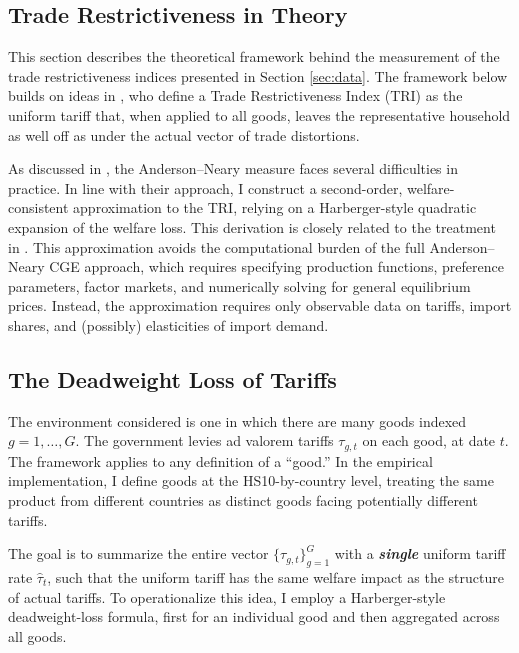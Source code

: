 \documentclass[12pt,pdftex]{article}
\begin{document}
\begin{onehalfspacing}
\section{Trade Restrictiveness in Theory}\label{sec:theory}

This section describes the theoretical framework behind the measurement of the trade restrictiveness indices presented in Section \ref{sec:data}. The framework below builds on ideas in \citet{anderson1996new, anderson2005measuring}, who define a Trade Restrictiveness Index (TRI) as the uniform tariff that, when applied to all goods, leaves the representative household as well off as under the actual vector of trade distortions.

As discussed in \citet{keeNicitaOlarreaga2009}, the Anderson--Neary measure faces several difficulties in practice. In line with their approach, I construct a second-order, welfare-consistent approximation to the TRI, relying on a Harberger-style quadratic expansion of the welfare loss. This derivation is closely related to the treatment in \citet{feenstra1995estimating}. This approximation avoids the computational burden of the full Anderson--Neary CGE approach, which requires specifying production functions, preference parameters, factor markets, and numerically solving for general equilibrium prices. Instead, the approximation requires only observable data on tariffs, import shares, and (possibly) elasticities of import demand.

\subsection{The Deadweight Loss of Tariffs}

The environment considered is one in which there are many goods indexed $g=1,\dots,G$. The government levies ad valorem tariffs $\tau_{g,t}$ on each good, at date $t$. The framework applies to any definition of a ``good.'' In the empirical implementation, I define goods at the HS10-by-country level, treating the same product from different countries as distinct goods facing potentially different tariffs.

The goal is to summarize the entire vector $\{\tau_{g,t}\}_{g=1}^G$ with a \textbf{\emph{single}} uniform tariff rate $\hat{\tau}_{t}$, such that the uniform tariff has the same welfare impact as the structure of actual tariffs. To operationalize this idea, I employ a Harberger-style deadweight-loss formula, first for an individual good and then aggregated across all goods.


\end{onehalfspacing}
\end{document}
